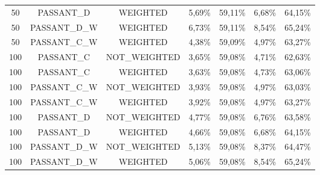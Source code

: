 \begin{table}[H]
{\begin{tabular}{ccccccc}
		50 &  PASSANT\_D &   WEIGHTED &     5,69\% &    59,11\% &     6,68\% &    64,15\% \\
		
		50 & PASSANT\_D\_W &   WEIGHTED &     6,73\% &    59,11\% &     8,54\% &    65,24\% \\
		
		50 & PASSANT\_C\_W &   WEIGHTED &     4,38\% &    59,09\% &     4,97\% &    63,27\% \\
		
		100 &  PASSANT\_C & NOT\_WEIGHTED &     3,65\% &    59,08\% &     4,71\% &    62,63\% \\
		
		100 &  PASSANT\_C &   WEIGHTED &     3,63\% &    59,08\% &     4,73\% &    63,06\% \\
		
		100 & PASSANT\_C\_W & NOT\_WEIGHTED &     3,93\% &    59,08\% &     4,97\% &    63,03\% \\
		
		100 & PASSANT\_C\_W &   WEIGHTED &     3,92\% &    59,08\% &     4,97\% &    63,27\% \\
		
		100 &  PASSANT\_D & NOT\_WEIGHTED &     4,77\% &    59,08\% &     6,76\% &    63,58\% \\
		
		100 &  PASSANT\_D &   WEIGHTED &     4,66\% &    59,08\% &     6,68\% &    64,15\% \\
		
		100 & PASSANT\_D\_W & NOT\_WEIGHTED &     5,13\% &    59,08\% &     8,37\% &    64,47\% \\
		
		100 & PASSANT\_D\_W &   WEIGHTED &     5,06\% &    59,08\% &     8,54\% &    65,24\% \\
		
	\end{tabular}  
}
\end{table}

